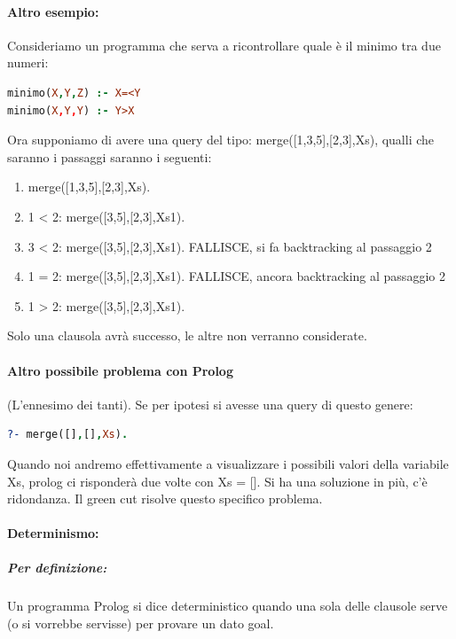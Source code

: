 \documentclass[12pt, a4paper, openany, oneside]{book}
\begin{document}
\paragraph{Altro esempio: }Consideriamo un programma che serva a ricontrollare 
quale è il minimo tra due numeri:
\begin{lstlisting}[language=Prolog] 
minimo(X,Y,Z) :- X=<Y
minimo(X,Y,Y) :- Y>X
\end{lstlisting} 
Ora supponiamo di avere una query del tipo: merge([1,3,5],[2,3],Xs), qualli che
saranno i passaggi saranno i seguenti:
\begin{enumerate}
	\item merge([1,3,5],[2,3],Xs).
	\item 1 < 2: merge([3,5],[2,3],Xs1).
	\item 3 < 2: merge([3,5],[2,3],Xs1). FALLISCE, si fa backtracking al passaggio
	2
	\item 1 = 2: merge([3,5],[2,3],Xs1). FALLISCE, ancora backtracking al passaggio
	2
	\item 1 > 2: merge([3,5],[2,3],Xs1).
\end{enumerate}
Solo una clausola avrà successo, le altre non verranno considerate.
\paragraph{Altro possibile problema con Prolog} (L'ennesimo dei tanti). Se per
ipotesi si avesse una query di questo genere: 
\begin{lstlisting}[language=Prolog] 
?- merge([],[],Xs).
\end{lstlisting} 
Quando noi andremo effettivamente a visualizzare i possibili valori della variabile
Xs, prolog ci risponderà due volte con Xs = []. Si ha una soluzione in più, c'è
ridondanza. Il green cut risolve questo specifico problema.
\paragraph{Determinismo: }
\subparagraph{Per definizione: }
Un programma Prolog si dice deterministico quando una sola delle clausole serve 
(o si vorrebbe servisse) per provare un dato goal. \\ \\
\end{document}
